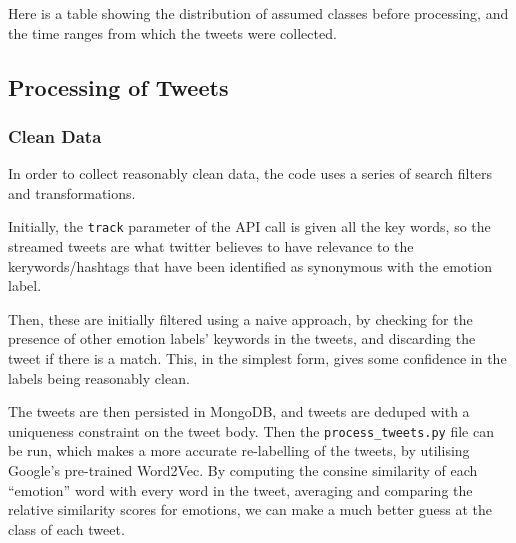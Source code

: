 \documentclass{mproj}
\begin{document}

Here is a table showing the distribution of assumed classes before processing, and the time ranges from which the tweets were collected.

{}

\subsection{Processing of Tweets}

\subsubsection{Clean Data}

In order to collect reasonably clean data, the code uses a series of search filters and transformations.

Initially, the \lstinline{track} parameter of the API call is given all the key words, so the streamed tweets are what twitter believes to have relevance to the kerywords/hashtags that have been identified as synonymous with the emotion label.

Then, these are initially filtered using a naive approach, by checking for the presence of other emotion labels' keywords in the tweets, and discarding the tweet if there is a match. This, in the simplest form, gives some confidence in the labels being reasonably clean.

The tweets are then persisted in MongoDB, and tweets are deduped with a uniqueness constraint on the tweet body. Then the \lstinline{process_tweets.py} file can be run, which makes a more accurate re-labelling of the tweets, by utilising Google's pre-trained Word2Vec. By computing the consine similarity of each ``emotion'' word with every word in the tweet, averaging and comparing the relative similarity scores for emotions, we can make a much better guess at the class of each tweet.
\end{document}
